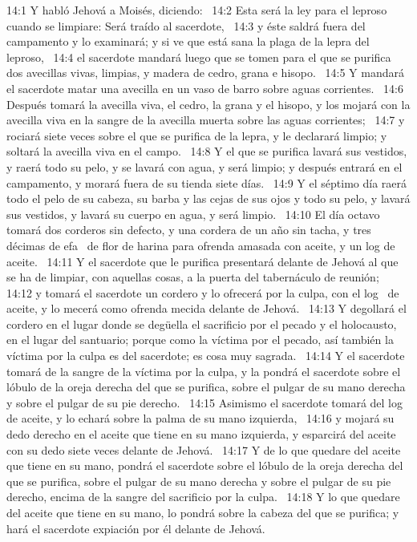14:1 Y habló Jehová a Moisés, diciendo:  
14:2 Esta será la ley para el leproso cuando se limpiare: Será traído al sacerdote,  
14:3 y éste saldrá fuera del campamento y lo examinará; y si ve que está sana la plaga de la lepra del leproso,  
14:4 el sacerdote mandará luego que se tomen para el que se purifica dos avecillas vivas, limpias, y madera de cedro, grana e hisopo.  
14:5 Y mandará el sacerdote matar una avecilla en un vaso de barro sobre aguas corrientes.  
14:6 Después tomará la avecilla viva, el cedro, la grana y el hisopo, y los mojará con la avecilla viva en la sangre de la avecilla muerta sobre las aguas corrientes;  
14:7 y rociará siete veces sobre el que se purifica de la lepra, y le declarará limpio; y soltará la avecilla viva en el campo.  
14:8 Y el que se purifica lavará sus vestidos, y raerá todo su pelo, y se lavará con agua, y será limpio; y después entrará en el campamento, y morará fuera de su tienda siete días.  
14:9 Y el séptimo día raerá todo el pelo de su cabeza, su barba y las cejas de sus ojos y todo su pelo, y lavará sus vestidos, y lavará su cuerpo en agua, y será limpio.  
14:10 El día octavo tomará dos corderos sin defecto, y una cordera de un año sin tacha, y tres décimas de efa  de flor de harina para ofrenda amasada con aceite, y un log de aceite.  
14:11 Y el sacerdote que le purifica presentará delante de Jehová al que se ha de limpiar, con aquellas cosas, a la puerta del tabernáculo de reunión;  
14:12 y tomará el sacerdote un cordero y lo ofrecerá por la culpa, con el log  de aceite, y lo mecerá como ofrenda mecida delante de Jehová.  
14:13 Y degollará el cordero en el lugar donde se degüella el sacrificio por el pecado y el holocausto, en el lugar del santuario; porque como la víctima por el pecado, así también la víctima por la culpa es del sacerdote; es cosa muy sagrada.  
14:14 Y el sacerdote tomará de la sangre de la víctima por la culpa, y la pondrá el sacerdote sobre el lóbulo de la oreja derecha del que se purifica, sobre el pulgar de su mano derecha y sobre el pulgar de su pie derecho.  
14:15 Asimismo el sacerdote tomará del log  de aceite, y lo echará sobre la palma de su mano izquierda,  
14:16 y mojará su dedo derecho en el aceite que tiene en su mano izquierda, y esparcirá del aceite con su dedo siete veces delante de Jehová.  
14:17 Y de lo que quedare del aceite que tiene en su mano, pondrá el sacerdote sobre el lóbulo de la oreja derecha del que se purifica, sobre el pulgar de su mano derecha y sobre el pulgar de su pie derecho, encima de la sangre del sacrificio por la culpa.  
14:18 Y lo que quedare del aceite que tiene en su mano, lo pondrá sobre la cabeza del que se purifica; y hará el sacerdote expiación por él delante de Jehová.  
